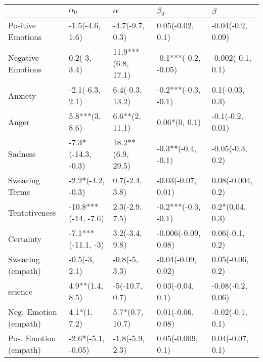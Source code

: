 \begin{tabular}{lllll}
\toprule
{} &           $\alpha_0$ &            $\alpha$ &             $\beta_0$ &            $\beta$ \\
\midrule
Positive Emotions     &      -1.5(-4.6, 1.6) &     -4.7(-9.7, 0.3) &      0.05(-0.02, 0.1) &  -0.04(-0.2, 0.09) \\
Negative Emotions     &         0.2(-3, 3.4) &  11.9***(6.8, 17.1) &  -0.1***(-0.2, -0.05) &  -0.002(-0.1, 0.1) \\
Anxiety               &      -2.1(-6.3, 2.1) &     6.4(-0.3, 13.2) &   -0.2***(-0.3, -0.1) &    0.1(-0.03, 0.3) \\
Anger                 &       5.8***(3, 8.6) &      6.6**(2, 11.1) &         0.06*(0, 0.1) &   -0.1(-0.2, 0.01) \\
Sadness               &   -7.3*(-14.3, -0.3) &   18.2**(6.9, 29.5) &    -0.3**(-0.4, -0.1) &   -0.05(-0.3, 0.2) \\
Swearing Terms        &    -2.2*(-4.2, -0.3) &      0.7(-2.4, 3.8) &    -0.03(-0.07, 0.01) &  0.08(-0.004, 0.2) \\
Tentativeness         &  -10.8***(-14, -7.6) &      2.3(-2.9, 7.5) &   -0.2***(-0.3, -0.1) &    0.2*(0.04, 0.3) \\
Certainty             &   -7.1***(-11.1, -3) &      3.2(-3.4, 9.8) &   -0.006(-0.09, 0.08) &    0.06(-0.1, 0.2) \\
Swearing (empath)     &        -0.5(-3, 2.1) &       -0.8(-5, 3.3) &    -0.04(-0.09, 0.02) &   0.05(-0.06, 0.2) \\
science               &      4.9**(1.4, 8.5) &      -5(-10.7, 0.7) &      0.03(-0.04, 0.1) &  -0.08(-0.2, 0.06) \\
Neg. Emotion (empath) &         4.1*(1, 7.2) &     5.7*(0.7, 10.7) &     0.01(-0.06, 0.08) &   -0.02(-0.1, 0.1) \\
Pos. Emotion (empath) &   -2.6*(-5.1, -0.05) &     -1.8(-5.9, 2.3) &     0.05(-0.009, 0.1) &   0.04(-0.07, 0.1) \\
\bottomrule
\end{tabular}
